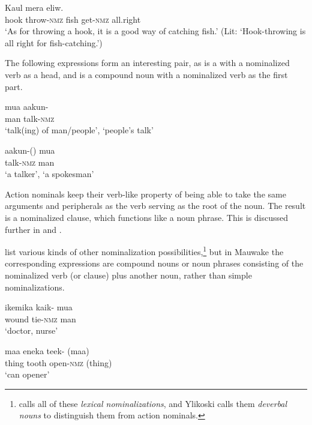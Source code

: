 \ea%
\label{ex:3:x67}
\gll Kaul   mera  eliw. \\
hook throw-\textsc{nmz} fish get-\textsc{nmz} all.right\\
\glt`As for throwing a hook, it is a good way of catching fish.' (Lit: `Hook-throwing is all right for fish-catching.') 
\z 

The following expressions form an interesting pair, as  is a  with a nominalized verb as a head, and  is a compound noun with a nominalized verb as the first part.

\ea%
\label{ex:3:x424}
\gll mua aakun- \\
man talk-\textsc{nmz}\\
\glt`talk(ing) of man/people', `people's talk'
\z

\ea%
\label{ex:3:x425}
\gll aakun-() mua \\
talk-\textsc{nmz} man\\
\glt`a talker', `a spokesman'
\z

Action nominals keep their verb-like property of being able to take the same arguments and peripherals as the verb serving as the root of the noun. The result is a nominalized clause, which functions like a noun phrase. This is discussed further in  and .

\citet[334--342]{ComrieEtAl2007} list various kinds of other nominalization possibilities,\footnote{\citet[500]{Givon1999} calls all of these \textit{lexical nominalizations}, and Ylikoski calls them \textit{deverbal nouns} \citeyear[193]{Ylikoski} to distinguish them from action nominals.} but in Mauwake the corresponding expressions are compound nouns or noun phrases consisting of the nominalized verb (or clause) plus another noun, rather than simple nominalizations. 

\ea%
\label{ex:3:x1232}
\gll ikemika kaik- mua \\
wound tie-\textsc{nmz} man\\
\glt`doctor, nurse'
\z

\ea%
\label{ex:3:x1233}
\gll maa eneka teek- (maa)\footnotemark{} \\
thing tooth open-\textsc{nmz} (thing)\\
\glt`can opener'
\z

